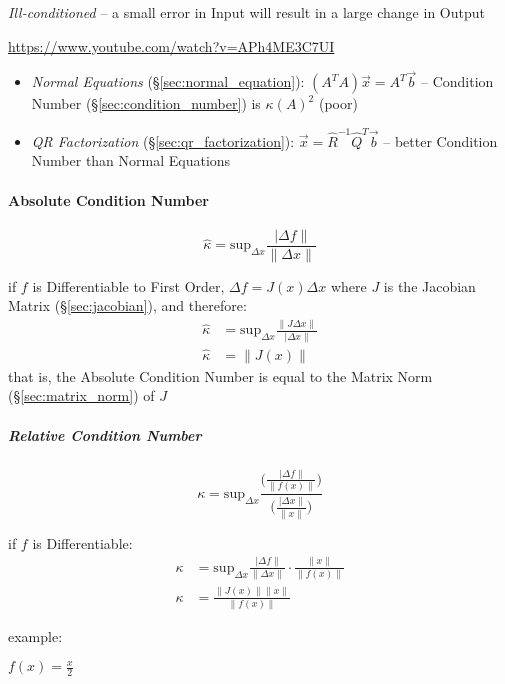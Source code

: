 \emph{Ill-conditioned} -- a small error in Input will result in a large change
in Output

\url{https://www.youtube.com/watch?v=APh4ME3C7UI}

\begin{itemize}
  \item \emph{Normal Equations} (\S\ref{sec:normal_equation}): $(A^TA)\vec{x} =
    A^T\vec{b}$ -- Condition Number (\S\ref{sec:condition_number}) is
    $\kappa(A)^2$ (poor)
  \item \emph{QR Factorization} (\S\ref{sec:qr_factorization}): $\vec{x} =
    \hat{R}^{-1}\hat{Q}^T\vec{b}$ -- better Condition Number than Normal
    Equations
\end{itemize}



\paragraph{Absolute Condition Number}\label{sec:absolute_condition_number}
\hfill

\[
  \hat{\kappa} = \mathrm{sup}_{\Delta x} \frac{\ |\Delta f\|}{\|\Delta x\|}
\]

if $f$ is Differentiable to First Order, $\Delta f = J(x) \Delta x$ where $J$
is the Jacobian Matrix (\S\ref{sec:jacobian}), and therefore:
\begin{align*}
  \hat{\kappa} & = \mathrm{sup}_{\Delta x} \frac{\|J\Delta x\|}{\ |\Delta x\|} \\
  \hat{\kappa} & = \|J(x)\|
\end{align*}
that is, the Absolute Condition Number is equal to the Matrix Norm
(\S\ref{sec:matrix_norm}) of $J$



\subparagraph{Relative Condition Number}\label{sec:relative_condition_number}
\hfill

\[
  \kappa = \mathrm{sup}_{\Delta x} \frac{
    \Big(\frac{\ |\Delta f\|}{\|f(x)\|}\Big)
  }{
    \Big(\frac{\ |\Delta x\|}{\|x\|}\Big)
  }
\]

if $f$ is Differentiable:
\begin{align*}
  \kappa & = \mathrm{sup}_{\Delta x}
    \frac{\ |\Delta f\|}{\|\Delta x\|} \cdot \frac{\|x\|}{\|f(x)\|} \\
  \kappa & = \frac{\|J(x)\| \|x\|}{\|f(x)\|}
\end{align*}

example:

$f(x) = \frac{x}{2}$

